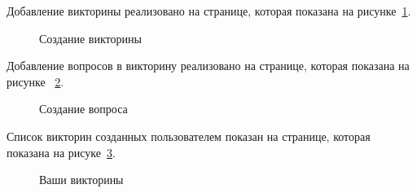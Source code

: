 \documentclass[14pt]{extarticle} %
\begin{document}
Добавление викторины реализовано на странице, которая показана на рисунке~\ref{newQuiz}.
\begin{figure}[!ht]
	\centering
	\caption{Создание викторины}
	\label{newQuiz}
\end{figure}

\newpage
Добавление вопросов в викторину реализовано на странице, которая показана на рисунке ~\ref{newQuest}.

\begin{figure}[!ht]
	\centering
	\caption{Создание вопроса}
	\label{newQuest}
\end{figure}

Список викторин созданных пользователем показан на странице, которая показана на рисуке~\ref{MyQuiz}.

\begin{figure}[!ht]
	\centering
	\caption{Ваши викторины}
	\label{MyQuiz}
\end{figure}
\end{document}
